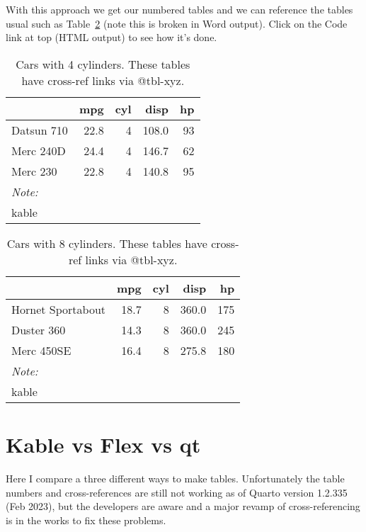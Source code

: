 \documentclass[
  letterpaper,
  oneside]{scrbook}
\begin{document}
With this approach we get our numbered tables and we can reference the
tables usual such as Table~\ref{tbl-cyl8} (note this is broken in Word
output). Click on the Code link at top (HTML output) to see how it's
done.

\hypertarget{tbl-cyl4}{}
\begin{table}
\caption{\label{tbl-cyl4}Cars with 4 cylinders. These tables have cross-ref links via @tbl-xyz. }\tabularnewline

\centering
\begin{tabular}[t]{lrrrr}
\toprule
  & mpg & cyl & disp & hp\\
\midrule
Datsun 710 & 22.8 & 4 & 108.0 & 93\\
Merc 240D & 24.4 & 4 & 146.7 & 62\\
Merc 230 & 22.8 & 4 & 140.8 & 95\\
\bottomrule
\multicolumn{5}{l}{\rule{0pt}{1em}\textit{Note: }}\\
\multicolumn{5}{l}{\rule{0pt}{1em}kable}\\
\end{tabular}
\end{table}

\hypertarget{tbl-cyl8}{}
\begin{table}
\caption{\label{tbl-cyl8}Cars with 8 cylinders. These tables have cross-ref links via @tbl-xyz. }\tabularnewline

\centering
\begin{tabular}[t]{lrrrr}
\toprule
  & mpg & cyl & disp & hp\\
\midrule
Hornet Sportabout & 18.7 & 8 & 360.0 & 175\\
Duster 360 & 14.3 & 8 & 360.0 & 245\\
Merc 450SE & 16.4 & 8 & 275.8 & 180\\
\bottomrule
\multicolumn{5}{l}{\rule{0pt}{1em}\textit{Note: }}\\
\multicolumn{5}{l}{\rule{0pt}{1em}kable}\\
\end{tabular}
\end{table}


\hypertarget{sec-kableflexgt}{%
\chapter{Kable vs Flex vs qt}\label{sec-kableflexgt}}

Here I compare a three different ways to make tables. Unfortunately the
table numbers and cross-references are still not working as of Quarto
version 1.2.335 (Feb 2023), but the developers are aware and a major
revamp of cross-referencing is in the works to fix these problems.
\end{document}
